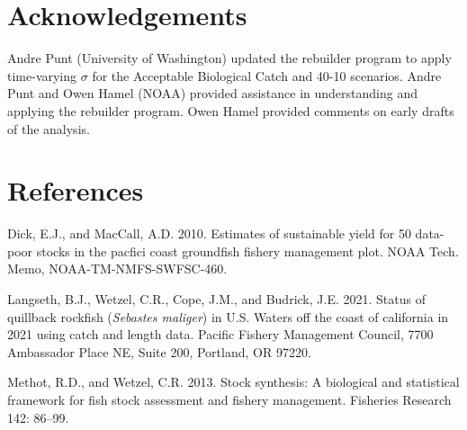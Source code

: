 \documentclass[11pt,
  english,
  letterpaper,
]{article}
\begin{document}

\hypertarget{acknowledgements}{%
\section{Acknowledgements}\label{acknowledgements}}

\leavevmode\tagmcend\tagstructend


Andre Punt (University of Washington) updated the rebuilder program to apply time-varying {\(\sigma\)\leavevmode\tagmcend\tagstructend} for the Acceptable Biological Catch and 40-10 scenarios. Andre Punt and Owen Hamel (NOAA) provided assistance in understanding and applying the rebuilder program. Owen Hamel provided comments on early drafts of the analysis.

\leavevmode\tagmcend\tagstructend\par

\clearpage


\hypertarget{references}{%
\section{References}\label{references}}

\leavevmode\tagmcend\tagstructend


\hypertarget{refs}{}
\leavevmode\hypertarget{ref-DickandMacCall_dbsra_2010}{}%
Dick, E.J., and MacCall, A.D. 2010. Estimates of sustainable yield for 50 data-poor stocks in the pacfici coast groundfish fishery management plot. NOAA Tech. Memo, NOAA-TM-NMFS-SWFSC-460.

\leavevmode\hypertarget{ref-Langseth_status_2021}{}%
Langseth, B.J., Wetzel, C.R., Cope, J.M., and Budrick, J.E. 2021. Status of quillback rockfish (\emph{Sebastes maliger}) in U.S. Waters off the coast of california in 2021 using catch and length data. Pacific Fishery Management Council, 7700 Ambassador Place NE, Suite 200, Portland, OR 97220.

\leavevmode\hypertarget{ref-methot_stock_2013}{}%
Methot, R.D., and Wetzel, C.R. 2013. Stock synthesis: A biological and statistical framework for fish stock assessment and fishery management. Fisheries Research 142: 86--99.
\end{document}
